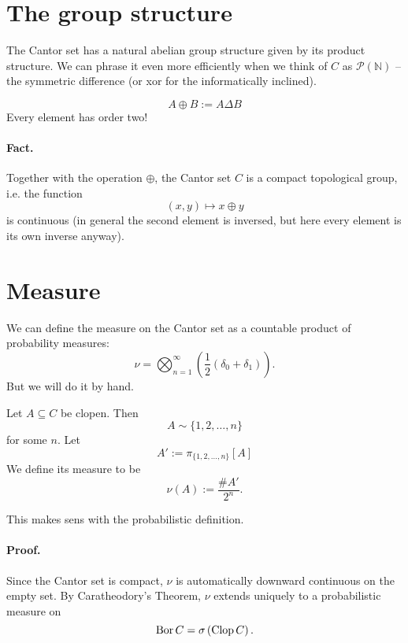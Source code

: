 \section{The group structure}

The Cantor set has a natural abelian group structure given by its product structure. We can phrase it even more efficiently when we think of \( C \) as \( \mathcal{P}( \mathbb{N} ) \) -- the symmetric difference (or xor for the informatically inclined).

\[ 
    A \oplus B := A \Delta B 
\]
Every element has order two!

\paragraph{Fact.} Together with the operation \( \oplus \), the Cantor set \( C \) is a compact topological group, i.e. the function
\[ 
    (x, y) \mapsto x \oplus y 
\]
is continuous (in general the second element is inversed, but here every element is its own inverse anyway). 

\section{Measure}

We can define the measure on the Cantor set as a countable product of probability measures:
\[ 
    \nu = \bigotimes_{n=1}^\infty ( \frac{1}{2} (\delta_0 + \delta_1) ).
\]
But we will do it by hand.
\begin{defn}
Let \( A \subseteq C \) be clopen. Then
\[ 
    A \sim \{1, 2, \ldots, n\} 
\]
for some \( n \). Let
\[ 
    A' := \pi_{\{1, 2, \ldots, n\} }[A]
\]We define its measure to be
\[ 
    \nu (A) := \frac{\# A'}{2^n}.
\]
\end{defn}
This makes sens with the probabilistic definition.


\paragraph{Proof.} Since the Cantor set is compact, \( \nu \) is automatically downward continuous on the empty set. By Caratheodory's Theorem, \( \nu \) extends uniquely to a probabilistic measure on 
\[ 
    \operatorname{Bor} C = \sigma \left( \operatorname{Clop} C \right).
\]

